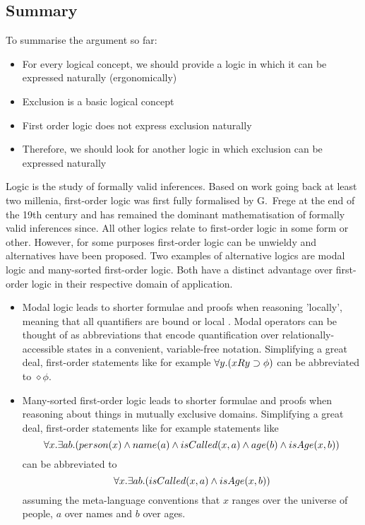 \subsection{Summary}
To summarise the argument so far:
\begin{itemize}
\item
For every logical concept, we should provide a logic in which it can be expressed naturally (ergonomically)
\item
Exclusion is a basic logical concept
\item
First order logic does not express exclusion naturally
\item
Therefore, we should look for another logic in which exclusion can be expressed naturally
\end{itemize}




\NI Logic is the study of formally valid inferences. Based on work
going back at least two millenia, first-order logic was first fully
formalised by G.~Frege at the end of the 19th century
\cite{FregeG:begriffsschrift} and has remained the dominant
mathematisation of formally valid inferences since.  All other logics
relate to first-order logic in some form or other. However, for some
purposes first-order logic can be unwieldy and alternatives have been
proposed. Two examples of alternative logics are modal logic and
many-sorted first-order logic.  Both have a distinct advantage over
first-order logic in their respective domain of application.

\begin{itemize}

\item Modal logic leads to shorter formulae and proofs when reasoning
  'locally', meaning that all quantifiers are bound or local
  \cite{BlackburnP:modlog}. Modal operators can be thought of as
  abbreviations that encode quantification over
  relationally-accessible states in a convenient, variable-free
  notation.  Simplifying a great deal, first-order statements like for
  example $\forall y. ( x R y \supset \phi)$ can be abbreviated to
  $\diamond \phi$.

\item Many-sorted first-order logic leads to shorter formulae and
  proofs when reasoning about things in mutually exclusive domains.
  Simplifying a great deal, first-order statements like for example
  statements like
\[
     \forall x. \exists ab.( person(x) \land name (a) \land isCalled( x, a ) \land age(b) \land isAge(x,b))
\]
can be abbreviated to
\[
     \forall x. \exists ab.( isCalled( x, a ) \land isAge(x,b))
\]
assuming the meta-language conventions that $x$ ranges over the
universe of people, $a$ over names and $b$ over ages.

\end{itemize}

